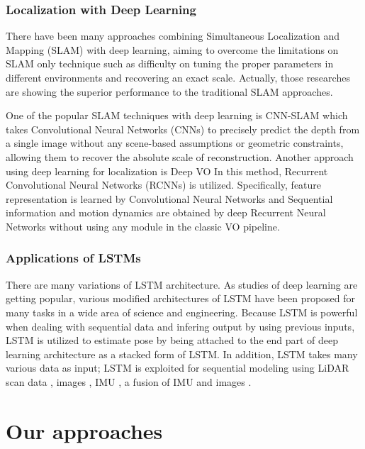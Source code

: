 \documentclass[letterpaper, 10 pt, conference]{ieeeconf}  %
\begin{document}
\subsubsection{Localization with Deep Learning}
There have been many approaches combining Simultaneous Localization and Mapping (SLAM) with deep learning, aiming to overcome the limitations on SLAM only technique such as difficulty on tuning the proper parameters in different environments and recovering an exact scale. Actually, those researches are showing the superior performance to the traditional SLAM approaches.


One of the popular SLAM techniques with deep learning is CNN-SLAM \cite{tateno2017cnn} which takes Convolutional Neural Networks (CNNs) to precisely predict the depth from a single image without any scene-based assumptions or geometric constraints, allowing them to recover the absolute scale of reconstruction. Another approach using deep learning for localization is Deep VO \cite{clark2017vinet} In this method, Recurrent Convolutional Neural Networks (RCNNs) is utilized. Specifically, feature representation is learned by Convolutional Neural Networks and Sequential information and motion dynamics are obtained by deep Recurrent Neural Networks without using any module in the classic VO pipeline.



\subsubsection{Applications of LSTMs}

There are many variations of LSTM architecture. As studies of deep learning are getting popular, various modified architectures of LSTM have been proposed for many tasks in a wide area of science and engineering. Because LSTM is powerful when dealing with sequential data and infering output by using previous inputs, LSTM is utilized to estimate pose by being attached to the end part of deep learning architecture \cite{wang2017deepvo, kendall2015posenet, turan2018deep}  as a stacked form of LSTM. In addition, LSTM takes many various data as input; LSTM is exploited for sequential modeling using LiDAR scan data \cite{gladh2016deep}, images \cite{walch2017image, wang2017deepvo}, IMU \cite{ordonez2016deep}, a fusion of IMU and images \cite{clark2017vinet}.


\section{Our approaches}
\end{document}
